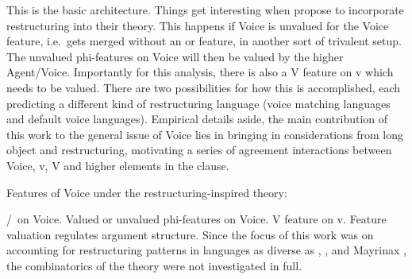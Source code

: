 \begin{exe}
\begin{xlist}
\begin{xlist}
\begin{xlist}
\begin{xlist}
\begin{xlist}
\begin{xlist}
\begin{exe}
\begin{xlist}
\begin{exe}
\begin{exe}
\begin{xlist}
\begin{exe}
\begin{exe}
\begin{xlist}
\begin{exe}
\begin{xlist}
\begin{exe}
\begin{xlist}
\begin{exe}
\begin{xlist}
\begin{exe}
\begin{xlist}
\begin{exe}
\begin{xlist}
\begin{exe}
\begin{xlist}
This is the basic architecture. Things get interesting when \cite{wurmbrandshimamura17} propose to incorporate restructuring into their theory. This happens if Voice is unvalued for the Voice feature, i.e.~gets merged without an  or  feature, in another sort of trivalent setup. The unvalued phi-features on Voice will then be valued by the higher Agent/Voice. Importantly for this analysis, there is also a V feature on v which needs to be valued. There are two possibilities for how this is accomplished, each predicting a different kind of restructuring language (voice matching languages and default voice languages). Empirical details aside, the main contribution of this work to the general issue of Voice lies in bringing in considerations from long object  and restructuring, motivating a series of agreement interactions between Voice, v, V and higher elements in the clause.
 \begin{exe}
 \ex  Features of Voice under the restructuring-inspired theory: 
 \begin{xlist} 
 	\ex  {}/\zero~on Voice. 
 	\ex  Valued or unvalued phi-features on Voice. 
 	\ex  V feature on v. 
 \z
\z 
Feature valuation regulates argument structure. Since the focus of this work was on accounting for restructuring patterns in languages as diverse as , ,  and Mayrinax , the combinatorics of the theory were not investigated in full.


\end{xlist}
\end{exe}
\end{xlist}
\end{exe}
\end{xlist}
\end{exe}
\end{xlist}
\end{exe}
\end{xlist}
\end{exe}
\end{xlist}
\end{exe}
\end{xlist}
\end{exe}
\end{xlist}
\end{exe}
\end{exe}
\end{xlist}
\end{exe}
\end{exe}
\end{xlist}
\end{exe}
\end{xlist}
\end{xlist}
\end{xlist}
\end{xlist}
\end{xlist}
\end{xlist}
\end{exe}
